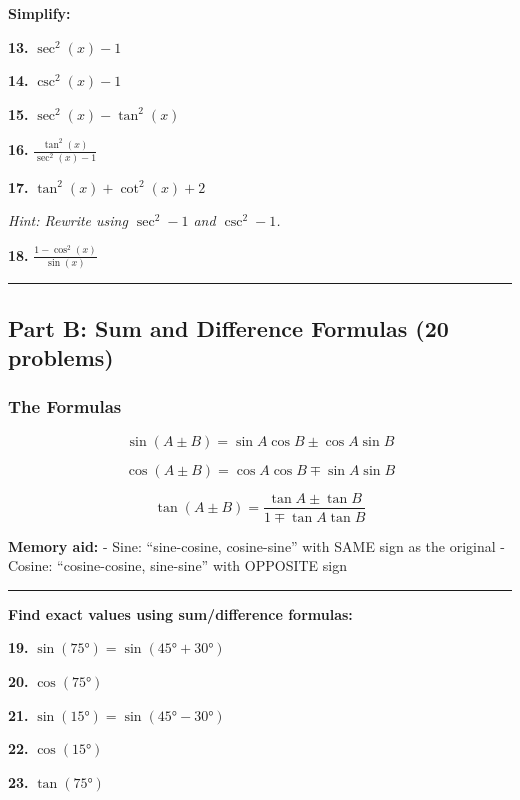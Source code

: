 \documentclass[
  11pt,
]{article}
\begin{document}
\textbf{Simplify:}

\textbf{13.} \(\sec^2(x) - 1\)

\textbf{14.} \(\csc^2(x) - 1\)

\textbf{15.} \(\sec^2(x) - \tan^2(x)\)

\textbf{16.} \(\frac{\tan^2(x)}{\sec^2(x) - 1}\)

\textbf{17.} \(\tan^2(x) + \cot^2(x) + 2\)

\emph{Hint: Rewrite using \(\sec^2 - 1\) and \(\csc^2 - 1\).}

\textbf{18.} \(\frac{1 - \cos^2(x)}{\sin(x)}\)

\begin{center}\rule{0.5\linewidth}{0.5pt}\end{center}

\hypertarget{part-b-sum-and-difference-formulas-20-problems}{%
\subsection{Part B: Sum and Difference Formulas (20
problems)}\label{part-b-sum-and-difference-formulas-20-problems}}

\hypertarget{the-formulas}{%
\subsubsection{The Formulas}\label{the-formulas}}

\[\boxed{\sin(A \pm B) = \sin A \cos B \pm \cos A \sin B}\]

\[\boxed{\cos(A \pm B) = \cos A \cos B \mp \sin A \sin B}\]

\[\boxed{\tan(A \pm B) = \frac{\tan A \pm \tan B}{1 \mp \tan A \tan B}}\]

\textbf{Memory aid:} - Sine: ``sine-cosine, cosine-sine'' with SAME sign
as the original - Cosine: ``cosine-cosine, sine-sine'' with OPPOSITE
sign

\begin{center}\rule{0.5\linewidth}{0.5pt}\end{center}

\textbf{Find exact values using sum/difference formulas:}

\textbf{19.} \(\sin(75°) = \sin(45° + 30°)\)

\textbf{20.} \(\cos(75°)\)

\textbf{21.} \(\sin(15°) = \sin(45° - 30°)\)

\textbf{22.} \(\cos(15°)\)

\textbf{23.} \(\tan(75°)\)
\end{document}
